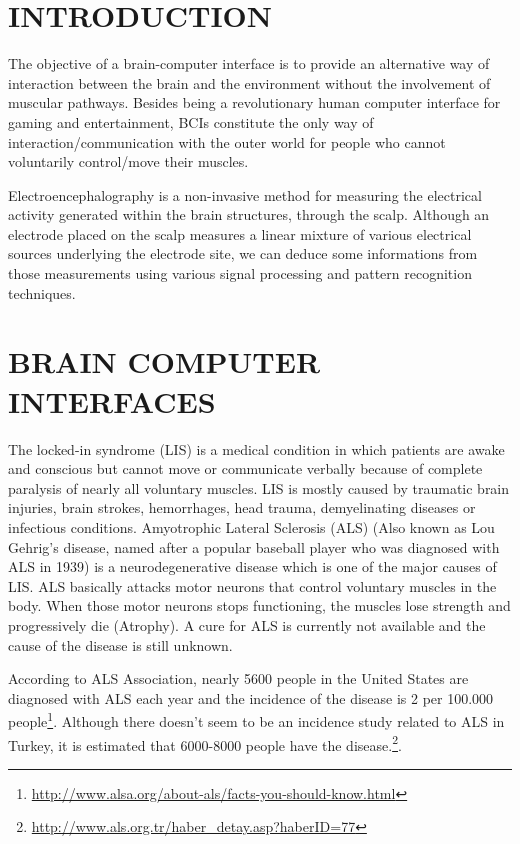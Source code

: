 \documentclass[12pt]{article}
\newcommand\mysection[1]{\vspace*{-0.35cm}\section{#1}\vspace*{6pt}\thispagestyle{empty}}
\numberwithin{equation}{section}
\numberwithin{figure}{section}
\numberwithin{table}{section}
\begin{document}
\mysection{INTRODUCTION}
\thispagestyle{fancy}
\cfoot{}
\par{
The objective of a brain-computer interface is to provide an alternative way of interaction between the brain and the environment
without the involvement of muscular pathways. Besides being a revolutionary human computer interface for gaming and entertainment,
BCIs constitute the only way of interaction/communication with the outer world for people who cannot voluntarily control/move their muscles.
}
\par {
Electroencephalography is a non-invasive method for measuring the electrical activity generated within the brain structures, through the scalp.
Although an electrode placed on the scalp measures a linear mixture of various electrical sources underlying the electrode site,
we can deduce some informations from those measurements using various signal processing and pattern recognition techniques.
}
\clearpage

\mysection{BRAIN COMPUTER INTERFACES}\label{seq:bci}

\par{
    The locked-in syndrome (LIS) is a medical condition in which patients are awake and conscious but
    cannot move or communicate verbally because of complete paralysis of nearly all voluntary muscles.
    LIS is mostly caused by traumatic brain injuries, brain strokes, hemorrhages, head trauma, demyelinating diseases
    or infectious conditions. Amyotrophic Lateral Sclerosis (ALS) (Also known as Lou Gehrig's disease,
    named after a popular baseball player who was diagnosed with ALS in 1939) is a neurodegenerative disease
    which is one of the major causes of LIS. ALS basically attacks motor neurons that control voluntary muscles in the body.
    When those motor neurons stops functioning, the muscles lose strength and progressively die (Atrophy).
    A cure for ALS is currently not available and the cause of the disease is still unknown.
}

\par {
    According to ALS Association, nearly 5600 people in the United States are
    diagnosed with ALS each year and the incidence of the disease is 2 per 100.000
    people\footnote{\url{http://www.alsa.org/about-als/facts-you-should-know.html}}. Although
    there doesn't seem to be an incidence study related to ALS in Turkey, it is estimated that
    6000-8000 people have the disease.\footnote{\url{http://www.als.org.tr/haber_detay.asp?haberID=77}}.
}
\end{document}
